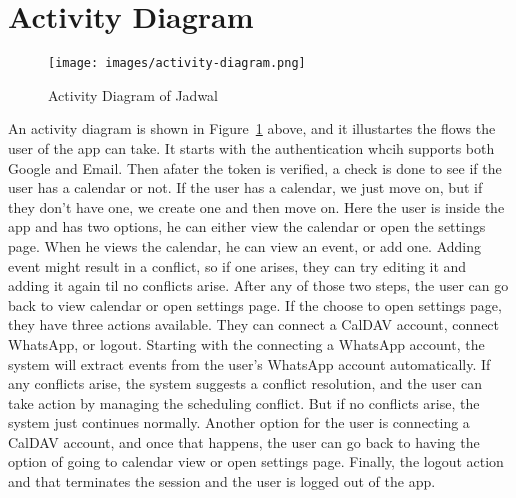 \section{Activity Diagram}

\begin{figure}[!h]
    \centering
    \texttt{[image: images/activity-diagram.png]}
    \caption{Activity Diagram of Jadwal}
    \label{fig:activity-diagram}
\end{figure}

\newpage

An activity diagram is shown in Figure~\ref{fig:activity-diagram} above, and it illustartes the flows the user of the app can take. It starts with the authentication whcih supports both Google and Email. Then afater the token is verified, a check is done to see if the user has a calendar or not. If the user has a calendar, we just move on, but if they don't have one, we create one and then move on. Here the user is inside the app and has two options, he can either view the calendar or open the settings page. When he views the calendar, he can view an event, or add one. Adding event might result in a conflict, so if one arises, they can try editing it and adding it again til no conflicts arise. After any of those two steps, the user can go back to view calendar or open settings page. If the choose to open settings page, they have three actions available. They can connect a CalDAV account, connect WhatsApp, or logout. Starting with the connecting a WhatsApp account, the system will extract events from the user's WhatsApp account automatically. If any conflicts arise, the system suggests a conflict resolution, and the user can take action by managing the scheduling conflict. But if no conflicts arise, the system just continues normally. Another option for the user is connecting a CalDAV account, and once that happens, the user can go back to having the option of going to calendar view or open settings page. Finally, the logout action and that terminates the session and the user is logged out of the app.

